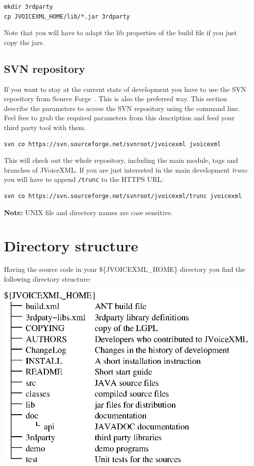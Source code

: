 \documentclass[11pt,a4paper]{article}
\begin{document}
\begin{lstlisting}
mkdir 3rdparty
cp JVOICEXML_HOME/lib/*.jar 3rdparty
\end{lstlisting}

Note that you will have to adapt the lib properties of the build file
if you just copy the jars.

\subsection{SVN repository}
\label{sec:cvs-repository}

If you want to stay at the current state of development you have to use
the SVN repository from Source Forge~\cite{sourceforge}.
This is also the preferred way.
This section describe the parameters to access the SVN repository 
using the command line. Feel free to grab the required parameters from
this description and feed your third party tool with them.

\begin{lstlisting}
svn co https://svn.sourceforge.net/svnroot/jvoicexml jvoicexml
\end{lstlisting}

This will check out the whole repository, including the main module,
tags and branches of JVoiceXML. If you are just interested in the
main development \emph{trunc} you will have to append \texttt{/trunc} to
the HTTPS URL:

\begin{lstlisting}
svn co https://svn.sourceforge.net/svnroot/jvoicexml/trunc jvoicexml
\end{lstlisting}

\textbf{Note:} UNIX file and directory names are case sensitive.

\section{Directory structure}
\label{sec:directory-structure}

Having the source code in your \$\{JVOICEXML\_HOME\} directory you
find the following directory structure:

\begin{center}
\includegraphics{structure.eps}
\end{center}
\end{document}
